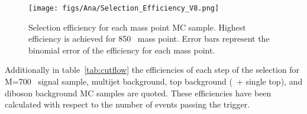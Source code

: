 \begin{figure}[!Hhtbp]
  \begin{center}
    \texttt{[image: figs/Ana/Selection\_Efficiency\_V8.png]}
    \caption{Selection efficiency for each mass point MC sample. Highest efficiency is achieved for 850 \GeVcc~mass point. Error bars represent the binomial error of the efficiency for each mass point.}
    \label{fig:MPEff}
  \end{center}
\end{figure}

Additionally in table~\ref{tab:cutflow} the efficiencies of each step of the selection for M=700 \GeVcc~signal sample, multijet background, top background (\ttbar~+ single top), and diboson background MC samples are quoted. These efficiencies have been calculated with respect to the number of events passing the trigger.

